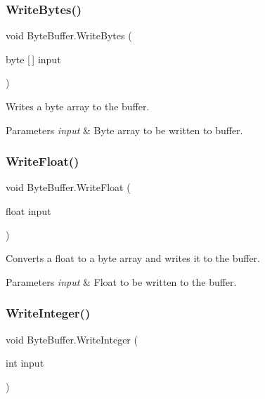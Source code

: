 \subsubsection{\texorpdfstring{WriteBytes()}{WriteBytes()}}
{\footnotesize\ttfamily void Byte\+Buffer.\+Write\+Bytes (\begin{DoxyParamCaption}\item[{byte \mbox{[}$\,$\mbox{]}}]{input }\end{DoxyParamCaption})}



Writes a byte array to the buffer. 


\begin{DoxyParams}{Parameters}
{\em input} & Byte array to be written to buffer.\\
\hline
\end{DoxyParams}
\mbox{\label{class_byte_buffer_a256bb398a33dc7469c3b2c498414b61d}} 
\subsubsection{\texorpdfstring{WriteFloat()}{WriteFloat()}}
{\footnotesize\ttfamily void Byte\+Buffer.\+Write\+Float (\begin{DoxyParamCaption}\item[{float}]{input }\end{DoxyParamCaption})}



Converts a float to a byte array and writes it to the buffer. 


\begin{DoxyParams}{Parameters}
{\em input} & Float to be written to the buffer.\\
\hline
\end{DoxyParams}
\mbox{\label{class_byte_buffer_a9343c632b31720770d4ea3bcabaac296}} 
\subsubsection{\texorpdfstring{WriteInteger()}{WriteInteger()}}
{\footnotesize\ttfamily void Byte\+Buffer.\+Write\+Integer (\begin{DoxyParamCaption}\item[{int}]{input }\end{DoxyParamCaption})}



